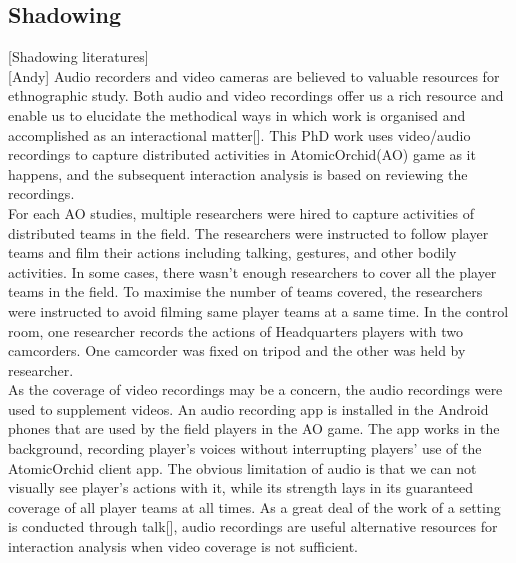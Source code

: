 \subsection{Shadowing}
[Shadowing literatures] \\

[Andy] Audio recorders and video cameras are believed to valuable resources for ethnographic study. Both audio and video recordings offer us a rich resource and enable us to elucidate the methodical ways in which work is organised and accomplished as an interactional matter[]. This PhD work uses video/audio recordings to capture distributed activities in AtomicOrchid(AO) game as it happens, and the subsequent interaction analysis is based on reviewing the recordings. \\

For each AO studies, multiple researchers were hired to capture activities of distributed teams in the field. The researchers were instructed to 
follow player teams and film their actions including talking, gestures, and other bodily activities. In some cases, there wasn't enough researchers to cover all the player teams in the field. To maximise the number of teams covered, the researchers were instructed to avoid filming same player teams at a same time. In the control room, one researcher records the actions of Headquarters players with two camcorders. One camcorder was fixed on tripod and the other was held by researcher. \\

As the coverage of video recordings may be a concern, the audio recordings were used to supplement videos. An audio recording app is installed in the Android phones that are used by the field players in the AO game. The app works in the background, recording player's voices without interrupting players' use of the AtomicOrchid client app. The obvious limitation of audio is that we can not visually see player's actions with it, while its strength lays in its guaranteed coverage of all player teams at all times. As a great deal of the work of a setting is conducted through talk[], audio recordings are useful alternative resources for interaction analysis when video coverage is not sufficient. \\


